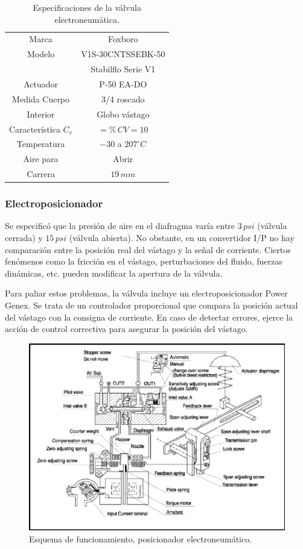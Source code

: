 \begin{table}[ht]
\renewcommand{\arraystretch}{1.3}
\centering
 \begin{tabular}{|c|c|}
  \hline
  Marca & Foxboro\\
  Modelo & V1S-30CNTSSEBK-50\\
	& Stabilflo Serie V1\\
 Actuador & P-50 EA-DO\\
 Medida Cuerpo & 3/4 roscado\\
 Interior & Globo vástago\\
 Característica $C_v$ & $=\%\,CV=10$\\
 Temperatura & $-30$ a $207^\circ C$\\
 Aire para & Abrir  \\
 Carrera & $19\,mm$ \\
  \hline
 \end{tabular}
 \caption{Especificaciones de la válvula electroneumática.}
 \label{tab:especifValvs}
\end{table}

\subsubsection{Electroposicionador}
Se especificó que la presión de aire en el diafragma varía entre $3\,psi$
(válvula cerrada) y $15\,psi$ (válvula abierta).
No obstante, en un convertidor I/P no hay comparación entre
la posición real del vástago y la señal de corriente.
Ciertos fenómenos como la fricción en el vástago, perturbaciones del fluido,
fuerzas dinámicas, etc. pueden modificar la apertura de la válvula.

Para paliar estos problemas, la válvula incluye un electroposicionador Power
Genex.
Se trata de un controlador proporcional que compara la posición actual del
vástago con la consigna de corriente.
En caso de detectar errores, ejerce la acción de control correctiva para
asegurar la posición del vástago.

\begin{figure}[t]
 \centering
 \includegraphics[scale=1.1]{Cap2-DisenoEnsamblado/images/PG-EPL.pdf}
 \caption{Esquema de funcionamiento, posicionador electroneumático.}
 \label{fig:elp-funcionamiento}
\end{figure}

